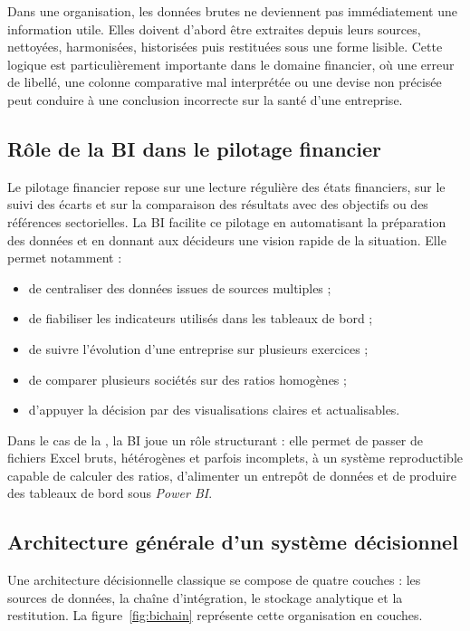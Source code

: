 \par Dans une organisation, les données brutes ne deviennent pas immédiatement
une information utile. Elles doivent d'abord être extraites depuis leurs sources,
nettoyées, harmonisées, historisées puis restituées sous une forme lisible. Cette
logique est particulièrement importante dans le domaine financier, où une erreur
de libellé, une colonne comparative mal interprétée ou une devise non précisée
peut conduire à une conclusion incorrecte sur la santé d'une entreprise.

\subsection{Rôle de la BI dans le pilotage financier}
\par Le pilotage financier repose sur une lecture régulière des états
financiers, sur le suivi des écarts et sur la comparaison des résultats avec des
objectifs ou des références sectorielles. La \ac{BI} facilite ce pilotage en
automatisant la préparation des données et en donnant aux décideurs une vision
rapide de la situation. Elle permet notamment :
\begin{itemize}[noitemsep]
  \item de centraliser des données issues de sources multiples ;
  \item de fiabiliser les indicateurs utilisés dans les tableaux de bord ;
  \item de suivre l'évolution d'une entreprise sur plusieurs exercices ;
  \item de comparer plusieurs sociétés sur des ratios homogènes ;
  \item d'appuyer la décision par des visualisations claires et actualisables.
\end{itemize}

\par Dans le cas de la \sfbt, la BI joue un rôle structurant : elle permet de
passer de fichiers Excel bruts, hétérogènes et parfois incomplets, à un système
reproductible capable de calculer des ratios, d'alimenter un entrepôt de données
et de produire des tableaux de bord sous \textit{Power BI}.

\subsection{Architecture générale d'un système décisionnel}
\par Une architecture décisionnelle classique se compose de quatre couches :
les sources de données, la chaîne d'intégration, le stockage analytique et la
restitution. La figure~\ref{fig:bichain} représente cette organisation en
couches.

